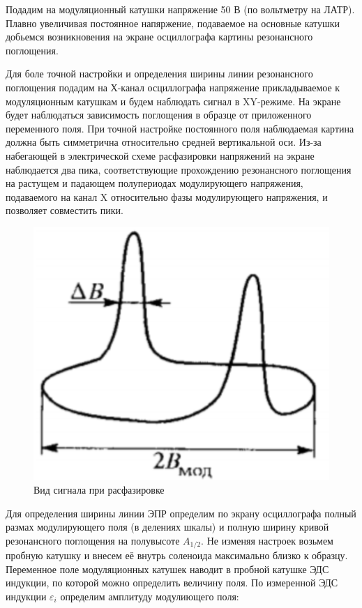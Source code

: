 \documentclass[a4paper]{article}
\begin{document}
\begin{enumerate}
    Подадим на модуляционный катушки напряжение 50 В (по вольтметру на ЛАТР).  Плавно увеличивая постоянное напяржение, подаваемое на основные катушки
    добьемся возникновения на экране осциллографа картины резонансного поглощения. \par 

    Для боле точной настройки и определения ширины линии резонансного поглощения подадим на Х-канал осциллографа  напряжение 
    прикладываемое к модуляционным катушкам и будем наблюдать сигнал в XY-режиме. На экране будет наблюдаться зависимость поглощения 
    в образце от приложенного переменного поля. При точной настройке постоянного поля наблюдаемая картина должна быть симметрична относительно 
    средней вертикальной оси. Из-за набегающей в электрической схеме расфазировки напряжений на экране наблюдается два пика, соответствующие прохождению 
    резонансного поглощения на растущем и падающем полупериодах модулирующего напряжения, подаваемого на канал X относительно фазы модулирующего напряжения, и 
    позволяет совместить пики.

    \begin{figure}[H]
        \begin{center}
        \includegraphics[scale = 0.8]{signal.png}
        \caption{Вид сигнала при расфазировке}
        \label{signal}
        \end{center}
    \end{figure}

    Для определения ширины линии ЭПР определим по экрану осциллографа полный размах модулирующего поля 
    (в делениях шкалы) и полную ширину кривой резонансного поглощения на полувысоте $A_{1/2}$. Не изменяя настроек возьмем
    пробную катушку и внесем её внутрь соленоида максимально близко к образцу. Переменное поле модуляционных катушек 
    наводит в пробной катушке ЭДС индукции, по которой можно определить величину поля. По измеренной ЭДС индукции $\varepsilon_i$ 
    определим амплитуду модулиющего поля:
    

\end{enumerate}
\end{document}
